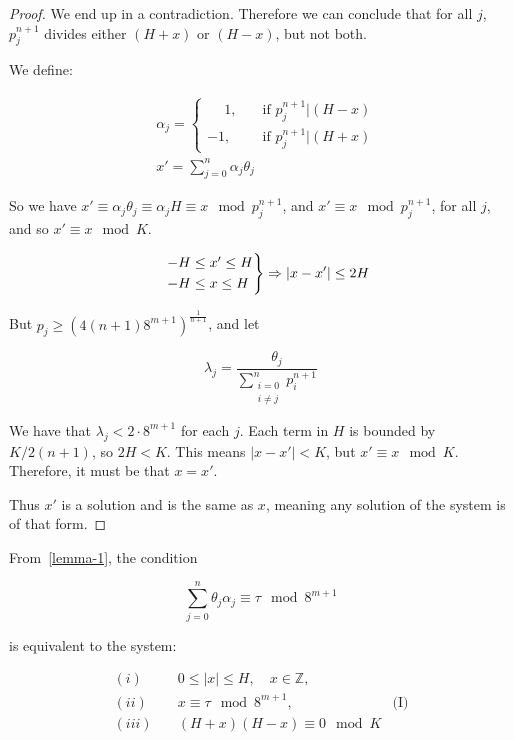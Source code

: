 \documentclass{amsart}
\theoremstyle{plain}
\renewcommand{\implies}{\Rightarrow}
\begin{document}
\begin{proof}
  We end up in a contradiction. Therefore we can conclude that for all $j$, $p_j^{n+1}$ divides
  either $(H+x)$ or $(H-x)$, but not both.

  We define:

  \begin{align*}
    &\alpha_j=
    \begin{cases}
      \phantom{-}1,  &\quad \text{if } p_j^{n+1}|(H-x)\\
      -1,  &\quad \text{if } p_j^{n+1}|(H+x)
    \end{cases}\\
    &x'=\sum_{j=0}^n\alpha_j\theta_j
  \end{align*}

  So we have $x'\equiv\alpha_j\theta_j\equiv\alpha_j H\equiv x\mod p_j^{n+1}$, and $x'\equiv x\mod
  p_j^{n+1}$, for all $j$, and so $x'\equiv x\mod K$.

  \begin{equation*}
    \begin{rcases}
      & -H\leq x'\leq H\\
      & -H\leq x\leq H\\
    \end{rcases} \implies |x-x'|\leq 2H
  \end{equation*}

  But $p_j\geq{(4(n+1)8^{m+1})}^\frac{1}{n+1}$, and let

  \begin{equation*}
    \lambda_j=\frac{\theta_j}{\sum_{\substack{i=0\\i\neq j}}^n p_i^{n+1}}
  \end{equation*}

  We have that $\lambda_j<2\cdot 8^{m+1}$ for each $j$. Each term in $H$ is bounded by $K/2(n+1)$,
  so $2H<K$. This means $|x-x'|<K$, but $x'\equiv x\mod K$. Therefore, it must be that $x=x'$.

  Thus $x'$ is a solution and is the same as $x$, meaning any solution of the system is of that
  form.
\end{proof}

From~\autoref{lemma-1}, the condition

\begin{equation*}
  \sum_{j=0}^n\theta_j\alpha_j\equiv\tau\mod 8^{m+1}
\end{equation*}

is equivalent to the system:

\begin{align*}
  (i) \quad &0\leq|x|\leq H, \quad x\in\mathbb{Z},\\
  (ii) \quad &x\equiv\tau\mod 8^{m+1}, &\text{(I)}\\
  (iii) \quad &(H+x)(H-x)\equiv 0\mod K
\end{align*}
\end{document}
